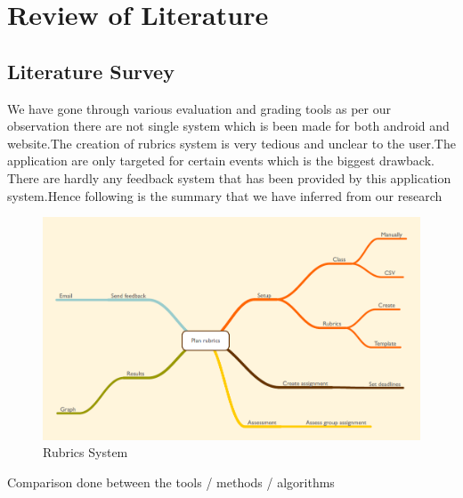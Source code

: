 \chapter{Review of Literature }
\section{Literature Survey}
We have gone through various evaluation and grading tools as per our observation there are not single system which is been made for both android and website.The creation of rubrics system is very tedious and unclear to the user.The application are only targeted for certain events which is the biggest drawback.\\
There are hardly any feedback system that has been provided by this application system.Hence following is the summary that we have inferred from our research\\
\begin{figure}[H]
\centering
\hfill\includegraphics[scale=0.6]{project/images/mindmap}\hspace*{\fill}
\caption{Rubrics System}
\end{figure}
\newpage
{Comparison done between the tools / methods / algorithms}
